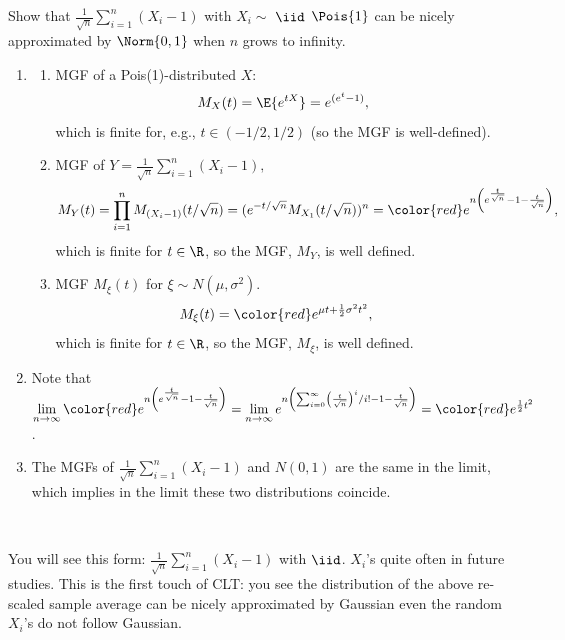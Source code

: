 \begin{exercise} 
	Show that $\frac{1}{\sqrt{n}}\sum_{i=1}^n (X_i-1)$ with $X_i\sim$ $\iid$ $\Pois{1}$ can be nicely approximated by $\Norm{0,1}$ when $n$ grows to infinity. 
	\begin{solution}
		\begin{enumerate} 
			\item 
			\begin{enumerate}
			\item {MGF of a Pois(1)-distributed $X$}: $$M_X(t)=\E{e^{tX}} =e^{(e^t-1)},$$ {which is finite for, e.g., $t\in (-1/2, 1/2)$ (so the MGF is well-defined)}.\\
			\item MGF of $Y=\frac{1}{\sqrt{n}}\sum_{i=1}^n (X_i-1),$
			\begin{align*}
				M_{Y}(t)= \prod_{i=1}^{n}M_{(X_i-1)}(t/\sqrt{n}) =(e^{-t/\sqrt{n}} M_{X_1}(t/\sqrt{n}))^n = {\color{red}e^{n\left(e^{\frac{t}{\sqrt{n}}}-1-\frac{t}{\sqrt{n}}\right)}}, 
			\end{align*} {which is finite for $t\in \R$, so the MGF,  $M_Y$, is well defined.} 
			\item {MGF $M_\xi(t)$ for $\xi \sim N(\mu,\sigma^2)$.}
			\begin{align*}
				{ M_\xi(t)}& =  {\color{red}e^{\mu t + \frac{1}{2}\sigma^2 t^2}}, 
			\end{align*}  {which is finite for $t\in \R$, so the MGF,  $M_\xi$, is well defined.} 
		\end{enumerate}
		\item Note that $\lim\limits_{n\rightarrow \infty }{\color{red}e^{n\left(e^{\frac{t}{\sqrt{n}}}-1-\frac{t}{\sqrt{n}}\right)}}= \lim\limits_{n\rightarrow \infty}{e^{n\left(\sum_{i=0}^{\infty}\left(\frac{t}{\sqrt{n}} \right)^i/i!   -1-\frac{t}{\sqrt{n}}\right)}}=  {\color{red}e^{\frac{1}{2}t^2}}$.
		\item{The MGFs of $\frac{1}{\sqrt{n}}\sum_{i=1}^n (X_i-1)$ and $N(0,1)$ are the same in the limit}, which implies in the limit these two distributions coincide.
	\end{enumerate}~\\
	\end{solution}
\end{exercise}

\begin{remark}
	You will see this form:
	 $\frac{1}{\sqrt{n}}\sum_{i=1}^n (X_i-1)$ with $\iid$. $X_i$'s quite often in future studies. This is the first touch of CLT: you see the distribution of the above re-scaled sample average can be nicely approximated by Gaussian even the random $X_i$'s do not follow Gaussian.\end{remark}


